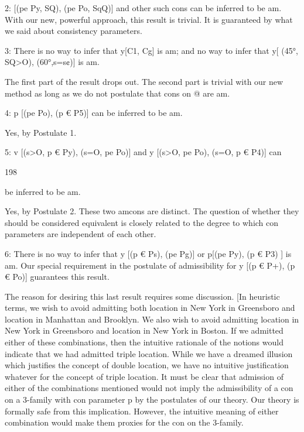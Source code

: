 \documentclass[10pt,twoside]{memoir}
\begin{document}
\begin{enumerate}
{{{2: [(pe Py, SQ), (pe Po, SqQ)] and other such cons can be inferred to be am. 
With our new, powerful approach, this result is trivial. It is guaranteed by 
what we said about consistency parameters. 

3: There is no way to infer that y[C1, Cg] is am; and no way to infer that 
y[ (45°, SQ>O), (60°,s=s¢)] is am. 

The first part of the result drops out. The second part is trivial with our new 
method as long as we do not postulate that cons on @ are am. 

4: p [(pe Po), (p € P5)] can be inferred to be am. 

Yes, by Postulate 1. 

5: v [(s>O, p € Py), (s=O, pe Po)] and y [(s>O, pe Po), (s=O, p € P4)] can 


198 


be inferred to be am. 

Yes, by Postulate 2. These two amcons are distinct. The question of whether 
they should be considered equivalent is closely related to the degree to 
which con parameters are independent of each other. 

6: There is no way to infer that y [(p € Ps), (pe Pg)] or p[(pe Py), (p € P3) 
] is am. Our special requirement in the postulate of admissibility for y [(p € 
P+), (p € Po)] guarantees this result. 

The reason for desiring this last result requires some discussion. [In 
heuristic terms, we wish to avoid admitting both location in New York in 
Greensboro and location in Manhattan and Brooklyn. We also wish to avoid 
admitting location in New York in Greensboro and location in New York in 
Boston. If we admitted either of these combinations, then the intuitive 
rationale of the notions would indicate that we had admitted triple location. 
While we have a dreamed illusion which justifies the concept of double 
location, we have no intuitive justification whatever for the concept of triple 
location. It must be clear that admission of either of the combinations 
mentioned would not imply the admissibility of a con on a 3-family with 
con parameter p by the postulates of our theory. Our theory is formally safe 
from this implication. However, the intuitive meaning of either combination 
would make them proxies for the con on the 3-family. 

}}}
\end{enumerate}
\end{document}
